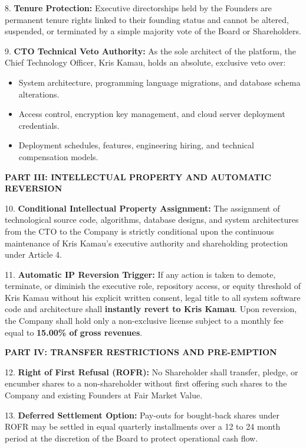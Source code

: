 \documentclass[11pt,a4paper]{article}
\begin{document}
8. \textbf{Tenure Protection:} Executive directorships held by the Founders are permanent tenure rights linked to their founding status and cannot be altered, suspended, or terminated by a simple majority vote of the Board or Shareholders.

9. \textbf{CTO Technical Veto Authority:} As the sole architect of the platform, the Chief Technology Officer, Kris Kamau, holds an absolute, exclusive veto over:
\begin{itemize}
    \item System architecture, programming language migrations, and database schema alterations.
    \item Access control, encryption key management, and cloud server deployment credentials.
    \item Deployment schedules, features, engineering hiring, and technical compensation models.
\end{itemize}

\newpage

\textbf{\color{CorporateNavy} PART III: INTELLECTUAL PROPERTY AND AUTOMATIC REVERSION}

10. \textbf{Conditional Intellectual Property Assignment:} The assignment of technological source code, algorithms, database designs, and system architectures from the CTO to the Company is strictly conditional upon the continuous maintenance of Kris Kamau's executive authority and shareholding protection under Article 4.

11. \textbf{Automatic IP Reversion Trigger:} If any action is taken to demote, terminate, or diminish the executive role, repository access, or equity threshold of Kris Kamau without his explicit written consent, legal title to all system software code and architecture shall \textbf{instantly revert to Kris Kamau}. Upon reversion, the Company shall hold only a non-exclusive license subject to a monthly fee equal to \textbf{15.00\% of gross revenues}.

\vspace{0.4cm}
\textbf{\color{CorporateNavy} PART IV: TRANSFER RESTRICTIONS AND PRE-EMPTION}

12. \textbf{Right of First Refusal (ROFR):} No Shareholder shall transfer, pledge, or encumber shares to a non-shareholder without first offering such shares to the Company and existing Founders at Fair Market Value.

13. \textbf{Deferred Settlement Option:} Pay-outs for bought-back shares under ROFR may be settled in equal quarterly installments over a 12 to 24 month period at the discretion of the Board to protect operational cash flow.
\end{document}

